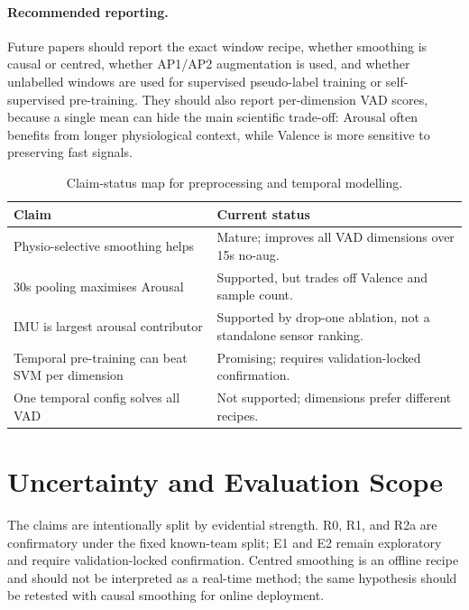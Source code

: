 \documentclass[sigconf,review,anonymous]{acmart}
\begin{document}
\paragraph{Recommended reporting.}
Future papers should report the exact window recipe, whether smoothing is
causal or centred, whether AP1/AP2 augmentation is used, and whether unlabelled
windows are used for supervised pseudo-label training or self-supervised
pre-training.
They should also report per-dimension VAD scores, because a single mean can
hide the main scientific trade-off: Arousal often benefits from longer
physiological context, while Valence is more sensitive to preserving fast
signals.

\begin{table}[t]
\caption{Claim-status map for preprocessing and temporal modelling.}
\label{tab:claim_status}
\centering
\setlength{\tabcolsep}{3pt}
\small
\begin{tabular}{p{}p{}}
\toprule
\textbf{Claim} & \textbf{Current status} \\
\midrule
Physio-selective smoothing helps & Mature; improves all VAD dimensions over 15s no-aug. \\
30s pooling maximises Arousal & Supported, but trades off Valence and sample count. \\
IMU is largest arousal contributor & Supported by drop-one ablation, not a standalone sensor ranking. \\
Temporal pre-training can beat SVM per dimension & Promising; requires validation-locked confirmation. \\
One temporal config solves all VAD & Not supported; dimensions prefer different recipes. \\
\bottomrule
\end{tabular}
\end{table}

\section{Uncertainty and Evaluation Scope}
\label{sec:uncertainty_scope}

The claims are intentionally split by evidential strength.
R0, R1, and R2a are confirmatory under the fixed known-team split;
E1 and E2 remain exploratory and require validation-locked confirmation.
Centred smoothing is an offline recipe and should not be interpreted as a
real-time method; the same hypothesis should be retested with causal smoothing
for online deployment.
\end{document}
